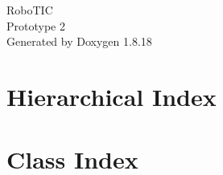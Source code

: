 \let\mypdfximage\pdfximage\def\pdfximage{\immediate\mypdfximage}\documentclass[twoside]{book}
\newcommand{\+}{\discretionary{\mbox{\scriptsize$\hookleftarrow$}}{}{}}
\newcommand{\clearemptydoublepage}{%
  \newpage{\pagestyle{empty}\cleardoublepage}%
}
\begin{document}
\hypersetup{pageanchor=false,
             bookmarksnumbered=true,
             pdfencoding=unicode
            }
\begin{titlepage}
\vspace*{7cm}
\begin{center}%
{\Large Robo\+T\+IC \\[1ex]\large Prototype 2 }\\
\vspace*{1cm}
{\large Generated by Doxygen 1.8.18}\\
\end{center}
\end{titlepage}
\clearemptydoublepage
{}
\tableofcontents
\clearemptydoublepage
{}
\hypersetup{pageanchor=true}

\chapter{Hierarchical Index}

\chapter{Class Index}

\end{document}

